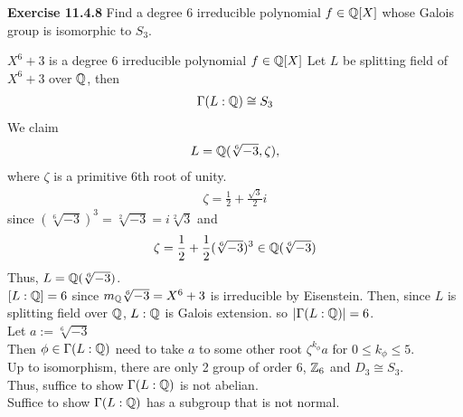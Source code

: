 \documentclass{article}
\begin{document}
\pagebreak

\begin{homeworkProblem}
    \textbf{Exercise 11.4.8} Find a degree $6$ irreducible polynomial $f \in \mathbb{Q}[X]$
    whose Galois group is isomorphic to $S_3$.\\
    \solution 

    $X^6 + 3$ is a degree $6$ irreducible polynomial $f \in \mathbb{Q}[X]$
    Let $L$ be splitting field of $X^6 + 3$ over $\mathbb{Q}$, then
    \begin{align}
        \Gamma (L: \mathbb{Q}) \cong S_3
    \end{align}
    We claim 
    \begin{align}
        L = \mathbb{Q} (\sqrt[6]{-3}, \zeta),
    \end{align}
    where $\zeta$ is a primitive 6th root of unity.
    \begin{align}
        \zeta = \frac{ 1 }{ 2 } + \frac{ \sqrt{3} }{ 2 } i
    \end{align}
    since $(\sqrt[6]{-3})^3 = \sqrt[2]{-3} = i \sqrt[2]{3}$ and
    \begin{align}
        \zeta = \frac{ 1 }{ 2 } + \frac{ 1 }{ 2 } (\sqrt[6]{-3})^3 \in \mathbb{Q}(\sqrt[6]{-3}) 
    \end{align}
    Thus, $L = \mathbb{Q} (\sqrt[6]{-3})$.\\
    $[L:\mathbb{Q}] = 6$ since $m_{\mathbb{Q}} \sqrt[6]{-3} = X^6 + 3$ is irreducible by Eisenstein.
    Then, since $L$ is splitting field over $\mathbb{Q}$, $L:\mathbb{Q}$ is Galois extension. 
    so $\lvert \Gamma(L:\mathbb{Q}) \rvert = 6$.\\
    Let $a := \sqrt[6]{-3}$\\
    Then $\phi \in \Gamma (L:\mathbb{Q})$ need to take $a$ to some other root $\zeta^{k_{\phi}} a$
    for $0 \leq k_{\phi} \leq 5$.\\
    Up to isomorphism, there are only 2 group of order 6, $\mathbb{Z}_6$ and $D_3 \cong S_3$.\\
    Thus, suffice to show $\Gamma (L:\mathbb{Q})$ is not abelian.\\
    Suffice to show $\Gamma (L:\mathbb{Q})$ has a subgroup that is not normal.\\


\end{homeworkProblem}
\end{document}
